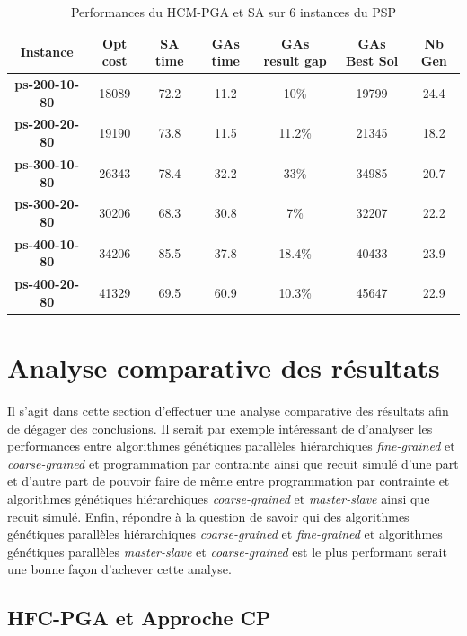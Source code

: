 \documentclass[12pt,a4paper]{article}
\begin{document}
	\begin{table}[h]
		\centering
		\begin{tabular}{|c|c|c|c|c|c|c|}
			\hline
			\textbf{Instance} & \textbf{Opt cost} & \textbf{SA time} & \textbf{GAs time} & \textbf{GAs result gap} & \textbf{GAs Best Sol} & \textbf{Nb Gen}\\
			\hline
			\textbf{ps-200-10-80} & 18089 & 72.2 & 11.2 & 10\% & 19799 & 24.4 \\
			\textbf{ps-200-20-80} & 19190 & 73.8 & 11.5 & 11.2\% & 21345 & 18.2 \\
			\textbf{ps-300-10-80} & 26343 & 78.4 & 32.2 & 33\% & 34985 & 20.7 \\
			\textbf{ps-300-20-80} & 30206 & 68.3 & 30.8 & 7\% & 32207 & 22.2 \\
			\textbf{ps-400-10-80} & 34206 & 85.5 & 37.8 & 18.4\% & 40433 & 23.9 \\
			\textbf{ps-400-20-80} & 41329 & 69.5 & 60.9 & 10.3\% & 45647 & 22.9 \\
			\hline
		\end{tabular}	
		\caption{Performances du HCM-PGA et SA sur 6 instances du PSP}	
	\end{table}					
	
		\section{Analyse comparative des résultats}
		Il s'agit dans cette section d'effectuer une analyse comparative des résultats afin de dégager des conclusions. Il serait par exemple intéressant de d'analyser les performances entre algorithmes génétiques parallèles hiérarchiques \emph{fine-grained} et \emph{coarse-grained} et programmation par contrainte ainsi que recuit simulé d'une part et d'autre part de pouvoir faire de même entre programmation par contrainte et algorithmes génétiques hiérarchiques \emph{coarse-grained} et \emph{master-slave} ainsi que recuit simulé. Enfin, répondre à la question de savoir qui des algorithmes génétiques parallèles hiérarchiques \emph{coarse-grained} et \emph{fine-grained} et algorithmes génétiques parallèles \emph{master-slave} et \emph{coarse-grained} est le plus performant serait une bonne façon d'achever cette analyse.
		
		\subsection{HFC-PGA et Approche CP}
		
\end{document}
